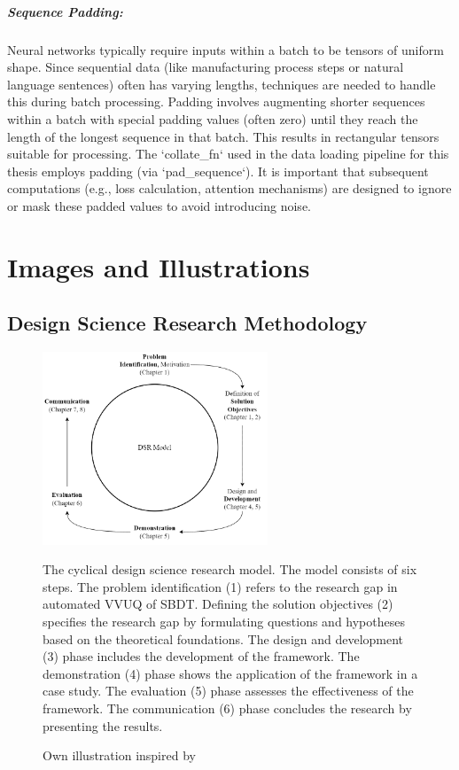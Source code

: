 \begin{appendices}
  \paragraph{Sequence Padding:}
  Neural networks typically require inputs within a batch to be tensors of uniform shape. Since sequential data (like manufacturing process steps or natural language sentences) often has varying lengths, techniques are needed to handle this during batch processing. Padding involves augmenting shorter sequences within a batch with special padding values (often zero) until they reach the length of the longest sequence in that batch. This results in rectangular tensors suitable for processing. The `collate\_fn` used in the data loading pipeline for this thesis employs padding (via `pad\_sequence`). It is important that subsequent computations (e.g., loss calculation, attention mechanisms) are designed to ignore or mask these padded values to avoid introducing noise.

  \chapter{Images and Illustrations}

  \section{Design Science Research Methodology}
  \begin{figure}[H]
    \centering
    \includegraphics[width=0.6\textwidth]{figures/dsr.png}
    \caption[Design Science Methodology]{The cyclical design science research model. The model consists of six steps. The problem identification (1) refers to the research gap in automated VVUQ of SBDT. Defining the solution objectives (2) specifies the research gap by formulating questions and hypotheses based on the theoretical foundations. The design and development (3) phase includes the development of the framework. The demonstration (4) phase shows the application of the framework in a case study. The evaluation (5) phase assesses the effectiveness of the framework. The communication (6) phase concludes the research by presenting the results.}
    \label{fig:DSR}
    \caption*{Own illustration inspired by \textcite{peffers2007design}}
  \end{figure}


\end{appendices}
